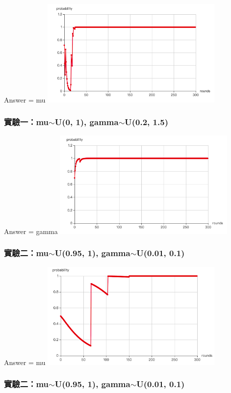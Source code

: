 \documentclass[12pt,a4paper]{beamer}
\begin{document}
\begin{CJK}{UTF8}{bsmi}
\begin{frame}
Answer = mu
\centering\includegraphics[width=90mm,scale=0.7]{exp1-1}

\end{frame}

\begin{frame}
\frametitle{實驗一：mu$\sim$U(0, 1), gamma$\sim$U(0.2, 1.5)}

Answer = gamma
\centering\includegraphics[width=90mm,scale=0.7]{exp1-2}

\end{frame}

\begin{frame}
\frametitle{實驗二：mu$\sim$U(0.95, 1), gamma$\sim$U(0.01, 0.1)}

Answer = mu
\centering\includegraphics[width=90mm,scale=0.7]{exp2-1}

\end{frame}

\begin{frame}
\frametitle{實驗二：mu$\sim$U(0.95, 1), gamma$\sim$U(0.01, 0.1)}


\end{frame}
\end{CJK}
\end{document}
